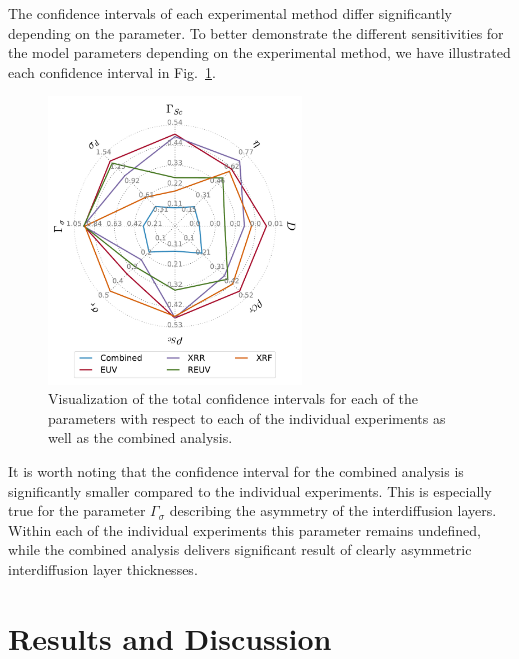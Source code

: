 \documentclass{iucr}              %
\begin{document}
The confidence intervals of each experimental method differ significantly depending on the parameter. To better demonstrate the different sensitivities for the model parameters depending on the experimental method, we have illustrated each confidence interval in Fig.~\ref{fig:confidence_intervals}.
\begin{figure}
  \centering
  \includegraphics[width=0.6\textwidth]{images/spiderplot_confidence_intervals_empty}
  \caption{Visualization of the total confidence intervals for each of the parameters with respect to each of the individual experiments as well as the combined analysis.}
  \label{fig:confidence_intervals}
\end{figure}
It is worth noting that the confidence interval for the combined analysis is significantly smaller compared to the individual experiments. This is especially true for the parameter $\Gamma_\sigma$ describing the asymmetry of the interdiffusion layers. Within each of the individual experiments this parameter remains undefined, while the combined analysis delivers significant result of clearly asymmetric interdiffusion layer thicknesses.


\section{Results and Discussion}
\end{document}
